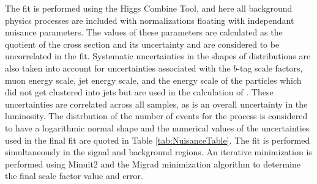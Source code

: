 The fit is performed using the Higgs Combine Tool\cite{combine}, and here all
 background physics processes are included
 with normalizations floating with independant nuisance parameters. 
The values of these parameters
 are calculated as the quotient of the cross section and its uncertainty and are
 considered to be uncorrelated in the fit.
Systematic uncertainties in the shapes of distributions are also taken into account
 for uncertainties associated with the $b$-tag scale factors, muon energy scale,
 jet energy scale, and the energy scale of the particles which did not get clustered into jets
 but are used in the calculation of \MET.
These uncertainties are correlated across all samples, as is an overall 
 uncertainty in the luminosity.
The distrbution of the
 number of events for the process is considered to have
 a logarithmic normal shape and the numerical values of
 the uncertainties used in the final fit are quoted in Table \ref{tab:NuisanceTable}.
The fit is performed simultaneously in the signal and background regions. An iterative 
minimization is performed using Minuit2 and the Migrad minimization 
algorithm to determine the final scale factor value and error. \cite{MNUserGuide}

